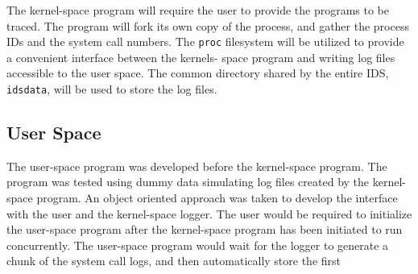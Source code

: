 \documentclass[paper=usletter, fontsize=12pt]{article}
\begin{document}
    The kernel-space program will require the user to provide the programs to
    be traced. The program will fork its own copy of the process, and gather
    the process IDs and the system call numbers. The \texttt{proc} filesystem
    will be utilized to provide a convenient interface between the kernels-
    space program and writing log files accessible to the user space. The
    common directory shared by the entire IDS, \texttt{idsdata}, will be used
    to store the log files.

    \subsection{User Space} The user-space program was developed before the
    kernel-space program. The program was tested using dummy data simulating
    log files created by the kernel-space program. An object oriented approach
    was taken to develop the interface with the user and the kernel-space
    logger. The user would be required to initialize the user-space program after the kernel-space program has been initiated to run concurrently. The user-space program would wait for the logger to generate a chunk of the system call logs, and then automatically store the first
\end{document}
